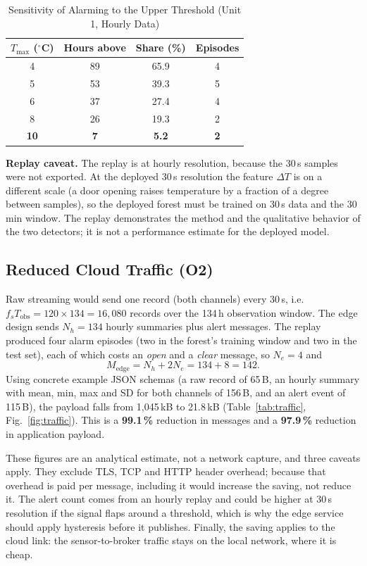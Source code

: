 \documentclass[conference]{IEEEtran}
\newcommand{\degC}{\ensuremath{^{\circ}}C}
\newcommand{\Tmax}{\ensuremath{T_{\max}}}
\begin{document}
\begin{table}[t]
\caption{Sensitivity of Alarming to the Upper Threshold (Unit 1, Hourly Data)}
\label{tab:sens}
\centering
\footnotesize
\begin{tabular}{cccc}
\toprule
\Tmax{} (\degC) & Hours above & Share (\%) & Episodes \\
\midrule
4 & 89 & 65.9 & 4 \\
5 & 53 & 39.3 & 5 \\
6 & 37 & 27.4 & 4 \\
8 & 26 & 19.3 & 2 \\
\textbf{10} & \textbf{7} & \textbf{5.2} & \textbf{2} \\
\bottomrule
\end{tabular}
\end{table}

\textbf{Replay caveat.} The replay is at hourly resolution, because the 30\,s samples were not exported. At the deployed 30\,s resolution the feature $\Delta T$ is on a different scale (a door opening raises temperature by a fraction of a degree between samples), so the deployed forest must be trained on 30\,s data and the 30\,min window. The replay demonstrates the method and the qualitative behavior of the two detectors; it is not a performance estimate for the deployed model.

\subsection{Reduced Cloud Traffic (O2)}
Raw streaming would send one record (both channels) every 30\,s, i.e.\ $f_s T_{\mathrm{obs}} = 120 \times 134 = 16{,}080$ records over the 134\,h observation window. The edge design sends $N_h = 134$ hourly summaries plus alert messages. The replay produced four alarm episodes (two in the forest's training window and two in the test set), each of which costs an \emph{open} and a \emph{clear} message, so $N_e = 4$ and
\begin{equation}
M_{\mathrm{edge}} = N_h + 2N_e = 134 + 8 = 142.
\label{eq:medge}
\end{equation}
Using concrete example JSON schemas (a raw record of 65\,B, an hourly summary with mean, min, max and SD for both channels of 156\,B, and an alert event of 115\,B), the payload falls from 1,045\,kB to 21.8\,kB (Table~\ref{tab:traffic}, Fig.~\ref{fig:traffic}). This is a \textbf{99.1\,\%} reduction in messages and a \textbf{97.9\,\%} reduction in application payload.

These figures are an analytical estimate, not a network capture, and three caveats apply. They exclude TLS, TCP and HTTP header overhead; because that overhead is paid per message, including it would increase the saving, not reduce it. The alert count comes from an hourly replay and could be higher at 30\,s resolution if the signal flaps around a threshold, which is why the edge service should apply hysteresis before it publishes. Finally, the saving applies to the cloud link: the sensor-to-broker traffic stays on the local network, where it is cheap.
\end{document}
